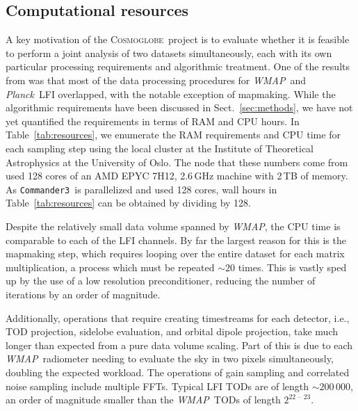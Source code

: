 \documentclass[twocolumn]{../../common/aa}
\def\WMAP{\emph{WMAP}}
\def\Planck{\emph{Planck}}
\def\commanderthree{\texttt{Commander3}}
\newcommand{\cosmoglobe}{\textsc{Cosmoglobe}}
\begin{document}
\subsection{Computational resources}
\label{sec:resources}

A key motivation of the \cosmoglobe\ project is to evaluate whether it is feasible to perform a joint analysis of two datasets simultaneously, each with its own particular processing requirements and algorithmic treatment. One of the results from \citet{bp17} was that most of the data processing procedures for  \WMAP\ and \Planck\ LFI overlapped, with the notable exception of mapmaking. While the algorithmic requirements have been discussed in Sect.~\ref{sec:methods}, we have not yet quantified the requirements in terms of RAM and CPU hours. In Table~\ref{tab:resources}, we enumerate the RAM requirements and CPU time for each sampling step using the local cluster at the Institute of Theoretical Astrophysics at the University of Oslo. The node that these numbers come from used 128 cores of an AMD EPYC 7H12, 2.6\,GHz machine with 2\,TB of memory. As \commanderthree\ is parallelized and used 128 cores, wall hours in Table~\ref{tab:resources} can be obtained by dividing by 128.

Despite the relatively small data volume spanned by \WMAP, the CPU time is comparable to each of the LFI channels.  By far the largest reason for this is the mapmaking step, which requires looping over the entire dataset for each matrix multiplication, a process which must be repeated $\sim20$ times. This is vastly sped up by the use of a low resolution preconditioner, reducing the number of iterations by an order of magnitude.


Additionally, operations that require creating timestreams for each detector, i.e., TOD projection, sidelobe evaluation, and orbital dipole projection, take much longer than expected from a pure data volume scaling. Part of this is due to each \WMAP\ radiometer needing to evaluate the sky in two pixels simultaneously, doubling the expected workload. The operations of gain sampling and correlated noise sampling include multiple FFTs. Typical LFI TODs are of length $\sim200\,000$, an order of magnitude smaller than the \WMAP\ TODs of length $2^{\text{22\ --\ 23}}$. 
\end{document}
